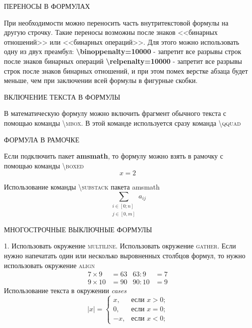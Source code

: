 \documentclass[a4paper,14pt]{extarticle}
\theoremstyle{plain} %
\theoremstyle{definition} %
\theoremstyle{remark} %
\begin{document}
ПЕРЕНОСЫ В ФОРМУЛАХ

При необходимости можно переносить часть внутритекстовой формулы на другую строчку. Такие переносы возможны после знаков <<бинарных отношений>> или <<бинарных операций>>. Для этого можно использовать одну из двух преамбул:\newline
\textbf{\textbackslash binoppenalty=10000} - запретит все разрывы строк после знаков бинарных операций\newline
\textbf{\textbackslash relpenalty=10000} - запретит все разрывы строк после знаков бинарных отношений, и при этом помех верстке абзаца будет меньше, чем при заключении всей формулы в фигурные скобки.

ВКЛЮЧЕНИЕ ТЕКСТА В ФОРМУЛЫ

В математическую формулу можно включить фрагмент обычного текста с помощью команды \textsc{\textbackslash mbox}. В этой команде используется сразу команда \textsc{\textbackslash qquad}

ФОРМУЛА В РАМОЧКЕ

Если подключить пакет \textbf{amsmath}, то формулу можно взять в рамочку с помощью команды \textsc{\textbackslash boxed}
\begin{equation*}
	\boxed{x=2}
\end{equation*}

Использование команды \textsc{\textbackslash substack} пакета amsmath
\begin{equation*}
	\sum_{\substack{i\in[0;n]\\j\in [0,m]}} a_{ij}
\end{equation*}

МНОГОСТРОЧНЫЕ ВЫКЛЮЧНЫЕ ФОРМУЛЫ

1. Использовать окружение \textsc{multiline}. Использовать окружение \textsc{gather}. Если нужно напечатать один или несколько выровненных столбцов формул, то нужно использовать окружение \textsc{align}
\begin{align*}
	7\times 9 & =63 & 63:9&=7\\
	9\times10 & =90 & 90:10& =9
\end{align*}
Использование текста в окружении \textit{cases}
\begin{equation*}
	|x|=
	\begin{cases}
		x,&\text{если $x>0$;}\\
		0,&\text{если $x=0$;}\\
		-x,&\text{если $x<0$;}
	\end{cases}
\end{equation*}
\end{document}
